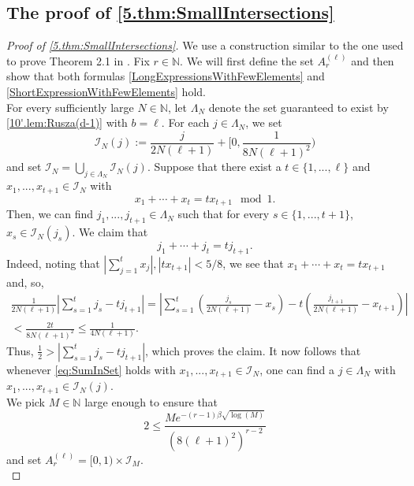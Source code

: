 \documentclass[11pt,american,preprint]{elsarticle}
\numberwithin{equation}{section}
\theoremstyle{plain}
\theoremstyle{plain*}
\theoremstyle{plain}
\theoremstyle{plain*}
\theoremstyle{plain}
\theoremstyle{plain*}
\theoremstyle{remark}
\theoremstyle{remark*}
\theoremstyle{remark}
\theoremstyle{remark*}
\theoremstyle{remark}
\theoremstyle{remark*}
\theoremstyle{plain}
\theoremstyle{definition}
\theoremstyle{plain}
\theoremstyle{plain} %
\newcommand{\N}{\mathbb{N}}
\begin{document}
\subsection{The proof of \cref{5.thm:SmallIntersections}}
\begin{proof}[Proof of \cref{5.thm:SmallIntersections}]
We use a construction similar to the one used to prove Theorem 2.1 in \cite{BHKNilSystems2005}.
Fix $r\in\N$. We will first define the set $A_r^{(\ell)}$ and then show that both formulas  \eqref{LongExpressionsWithFewElements} and \eqref{ShortExpressionWithFewElements} hold.\\

 For  every sufficiently large  $N\in\N$, let $\Lambda_N$ denote the set guaranteed to exist by \cref{10'.lem:Rusza(d-1)} with $b=\ell$. For each $j\in\Lambda_N$, we set
$$
\mathcal I_N(j):= \frac{j}{2N(\ell+1)}+[0,\frac{1}{8N(\ell+1)^2})
$$
and set $\mathcal I_N=\bigcup_{j\in\Lambda_N}\mathcal I_N(j)$. Suppose that there exist a $t\in\{1,...,\ell\}$ and $x_1,...,x_{t+1}\in \mathcal I_N$ with 
\begin{equation}\label{eq:SumInSet}
x_1+\cdots+x_t=tx_{t+1}\mod 1.
\end{equation}
Then, we can find $j_1,...,j_{t+1}\in\Lambda_N$  such that 
for every $s\in\{1,...,t+1\}$, $x_s\in\mathcal I_N(j_s)$.
We claim that 
$$
j_1+\cdots+j_t=tj_{t+1}.
$$
Indeed, noting that  
$|\sum_{j=1}^tx_j|,|tx_{t+1}|<5/8$, we see  that $x_1+\cdots+x_t=tx_{t+1}$ and, so, 
\begin{multline}
    \frac{1}{2N(\ell+1)}|\sum_{s=1}^tj_s-tj_{t+1}|=|\sum_{s=1}^t \left(\frac{j_s}{2N(\ell+1)}-x_s\right)-t\left(\frac{j_{t+1}}{2N(\ell+1)}-x_{t+1}\right)|\\
    <\frac{2t}{8N(\ell+1)^2}\leq \frac{1}{4N(\ell+1)}.
\end{multline}
Thus,
$
\frac{1}{2}>|\sum_{s=1}^t j_s-tj_{t+1}|
$, which proves the claim. It now follows that whenever \eqref{eq:SumInSet} holds with $x_1,...,x_{t+1}\in \mathcal I_N$, one can find a $j\in\Lambda_N$ with $x_1,...,x_{t+1}\in \mathcal I_N(j)$.\\
We pick $M\in\N$ large enough to ensure that 
\begin{equation}\label{eq:ChoiceOfM}
2\leq \frac{Me^{-(r-1)\beta\sqrt{\log(M)}}}{(8(\ell+1)^2)^{r-2}}
\end{equation}
and set  $A_r^{(\ell)}=[0,1)\times \mathcal I_M$.\\


\end{proof}
\end{document}
